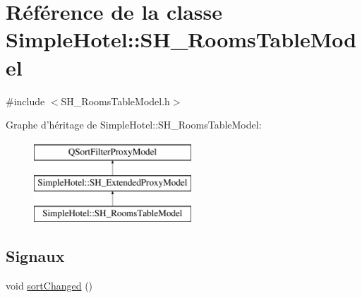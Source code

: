 \hypertarget{classSimpleHotel_1_1SH__RoomsTableModel}{\section{Référence de la classe Simple\-Hotel\-:\-:S\-H\-\_\-\-Rooms\-Table\-Model}
\label{classSimpleHotel_1_1SH__RoomsTableModel}
}


{\ttfamily \#include $<$S\-H\-\_\-\-Rooms\-Table\-Model.\-h$>$}

Graphe d'héritage de Simple\-Hotel\-:\-:S\-H\-\_\-\-Rooms\-Table\-Model\-:\begin{figure}[H]
\begin{center}
\leavevmode
\includegraphics[height=3.000000cm]{classSimpleHotel_1_1SH__RoomsTableModel}
\end{center}
\end{figure}
\subsection*{Signaux}
\begin{DoxyCompactItemize}
\item 
void \hyperlink{classSimpleHotel_1_1SH__ExtendedProxyModel_adb9ae03a88cda8d9efbed47527b5186a}{sort\-Changed} ()
\end{DoxyCompactItemize}
